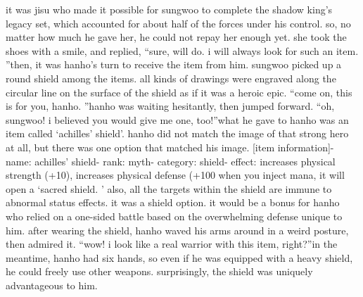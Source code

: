 it was jisu who made it possible for sungwoo to complete the shadow king’s legacy set, which accounted for about half of the forces under his control.
 so, no matter how much he gave her, he could not repay her enough yet.
she took the shoes with a smile, and replied, “sure, will do.
 i will always look for such an item.
”then, it was hanho’s turn to receive the item from him.
 sungwoo picked up a round shield among the items.
 all kinds of drawings were engraved along the circular line on the surface of the shield as if it was a heroic epic.
“come on, this is for you, hanho.
”hanho was waiting hesitantly, then jumped forward.
“oh, sungwoo! i believed you would give me one, too!”what he gave to hanho was an item called ‘achilles’ shield’.
 hanho did not match the image of that strong hero at all, but there was one option that matched his image.
[item information]- name: achilles’ shield- rank: myth- category: shield- effect: increases physical strength (+10), increases physical defense (+100%
 when you inject mana, it will open a ‘sacred shield.
’ also, all the targets within the shield are immune to abnormal status effects.
it was a shield option.
 it would be a bonus for hanho who relied on a one-sided battle based on the overwhelming defense unique to him.
after wearing the shield, hanho waved his arms around in a weird posture, then admired it.
“wow! i look like a real warrior with this item, right?”in the meantime, hanho had six hands, so even if he was equipped with a heavy shield, he could freely use other weapons.
 surprisingly, the shield was uniquely advantageous to him.

